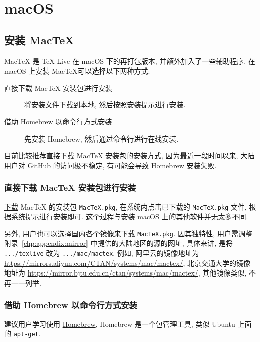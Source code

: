 
\chapter{macOS}\label{chap:macOS}

\section{安装 Mac\TeX}

Mac\TeX{} 是 \TeX{} Live 在 macOS 下的再打包版本,
并额外加入了一些辅助程序.
在 macOS 上安装 Mac\TeX 可以选择以下两种方式: 
\begin{description}
  \item[直接下载 Mac\TeX{} 安装包进行安装]
  将安装文件下载到本地,
  然后按照安装提示进行安装.
  \item[借助 Homebrew 以命令行方式安装]
  先安装 Homebrew,
  然后通过命令行进行在线安装.
\end{description}

目前比较推荐直接下载 Mac\TeX{} 安装包的安装方式,
因为最近一段时间以来,
大陆用户对 GitHub 的访问极不稳定,
有可能会导致 Homebrew 安装失败.

\subsection{直接下载 Mac\TeX{} 安装包进行安装}

\href{https://mirror.ctan.org/systems/mac/mactex/MacTeX.pkg}{下载} Mac\TeX{} 的安装包 \texttt{MacTeX.pkg},
在系统内点击已下载的 \texttt{MacTeX.pkg} 文件,
根据系统提示进行安装即可.
这个过程与安装 macOS 上的其他软件并无太多不同.

另外,
用户也可以选择国内各个镜像来下载 \texttt{MacTeX.pkg}.
因其独特性,
用户需调整附录~\ref{chp:appendix:mirror} 中提供的大陆地区的源的网址,
具体来讲,
是将 \texttt{.../texlive} 改为 \texttt{.../mac/mactex}.
例如,
阿里云的镜像地址为 \url{https://mirrors.aliyun.com/CTAN/systems/mac/mactex/},
北京交通大学的镜像地址为 \url{https://mirror.bjtu.edu.cn/ctan/systems/mac/mactex/},
其他镜像类似,
不再一一列举.

\subsection{借助 Homebrew 以命令行方式安装}

建议用户学习使用 \href{https://brew.sh}{Homebrew},
Homebrew 是一个包管理工具,
类似 Ubuntu 上面的 \texttt{apt-get}.


